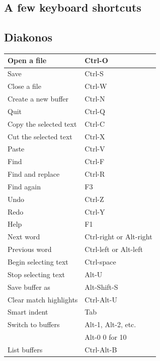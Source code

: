 \documentclass[10pt,a4paper,landscape,english,twoside]{article}
\begin{document}
\begin{multicols}{2}
\section*{A few keyboard shortcuts}
\subsection*{Diakonos}
{
\setlength{\extrarowheight}{1.5pt}
\begin{tabular}[t]{|l|l|}
\hline
Open a file            & Ctrl-O\\ \hline
Save                   & Ctrl-S\\ \hline
Close a file           & Ctrl-W\\ \hline
Create a new buffer    & Ctrl-N\\ \hline
Quit                   & Ctrl-Q\\ \hline
Copy the selected text & Ctrl-C\\ \hline
Cut the selected text  & Ctrl-X\\ \hline
Paste                  & Ctrl-V\\ \hline
Find                   & Ctrl-F\\ \hline
Find and replace       & Ctrl-R\\ \hline
Find again             & F3\\ \hline
Undo                   & Ctrl-Z\\ \hline
Redo                   & Ctrl-Y\\ \hline
Help                   & F1\\ \hline
Next word              & Ctrl-right or Alt-right\\ \hline
Previous word          & Ctrl-left or Alt-left\\ \hline
Begin selecting text   & Ctrl-space\\ \hline
Stop selecting text    & Alt-U\\ \hline
Save buffer as         & Alt-Shift-S\\ \hline
Clear match highlights & Ctrl-Alt-U\\ \hline
Smart indent           & Tab\\ \hline
Switch to buffers      & Alt-1, Alt-2, etc.\\
&Alt-0 0 for 10\\ \hline
List buffers           & Ctrl-Alt-B\\ \hline
\end{tabular}
}

\end{multicols}
\end{document}
